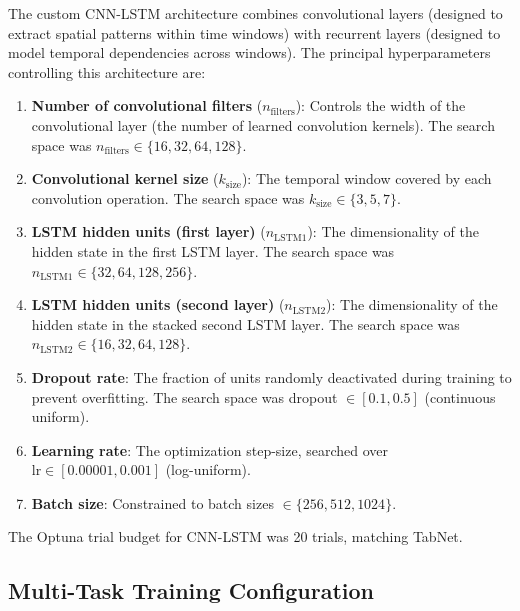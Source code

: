 \documentclass[../main.tex]{subfiles}
\begin{document}
The custom CNN-LSTM architecture combines convolutional layers (designed to extract spatial patterns within time windows) with recurrent layers (designed to model temporal dependencies across windows).  The principal hyperparameters controlling this architecture are:

\begin{enumerate}
    \item \textbf{Number of convolutional filters} ($n_{\text{filters}}$): Controls the width of the convolutional layer (the number of learned convolution kernels).  The search space was $n_{\text{filters}} \in \{16, 32, 64, 128\}$.

    \item \textbf{Convolutional kernel size} ($k_{\text{size}}$): The temporal window covered by each convolution operation.  The search space was $k_{\text{size}} \in \{3, 5, 7\}$.

    \item \textbf{LSTM hidden units (first layer)} ($n_{\text{LSTM1}}$): The dimensionality of the hidden state in the first LSTM layer.  The search space was $n_{\text{LSTM1}} \in \{32, 64, 128, 256\}$.

    \item \textbf{LSTM hidden units (second layer)} ($n_{\text{LSTM2}}$): The dimensionality of the hidden state in the stacked second LSTM layer.  The search space was $n_{\text{LSTM2}} \in \{16, 32, 64, 128\}$.

    \item \textbf{Dropout rate}: The fraction of units randomly deactivated during training to prevent overfitting.  The search space was dropout $\in [0.1, 0.5]$ (continuous uniform).

    \item \textbf{Learning rate}: The optimization step-size, searched over $\text{lr} \in [0.00001, 0.001]$ (log-uniform).

    \item \textbf{Batch size}: Constrained to batch sizes $\in \{256, 512, 1024\}$.
\end{enumerate}

The Optuna trial budget for CNN-LSTM was 20 trials, matching TabNet.

\subsection{Multi-Task Training Configuration}
\label{sec:hpo-multitask}
\end{document}
